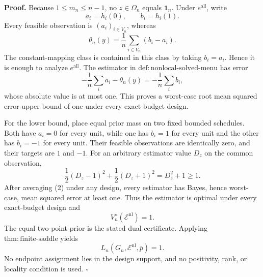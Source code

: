 \textbf{Proof.}
Because \(1\le m_n\le n-1\), no \(z\in\Omega_n\) equals \(\mathbf 1_n\).  Under \(e^{\mathrm{all}}\), write
\[
 a_i=h_i(0),\qquad b_i=h_i(1).
\]
Every feasible observation is \((a_i)_{i\in V_n}\), whereas
\[
 \theta_n(y)=\frac1n\sum_{i\in V_n}(b_i-a_i). \tag{1}
\]
The constant-mapping class is contained in this class by taking \(b_i=a_i\).  Hence it is enough to analyze \(e^{\mathrm{all}}\).  The estimator in \(\mathrm{def{:}nonlocal\text{-}solved\text{-}menu}\) has error
\[
 -\frac1n\sum_i a_i-\theta_n(y)
 =-\frac1n\sum_i b_i,
\]
whose absolute value is at most one.  This proves a worst-case root mean squared error upper bound of one under every exact-budget design.

For the lower bound, place equal prior mass on two fixed bounded schedules.  Both have \(a_i=0\) for every unit, while one has \(b_i=1\) for every unit and the other has \(b_i=-1\) for every unit.  Their feasible observations are identically zero, and their targets are \(1\) and \(-1\).  For an arbitrary estimator value \(D_z\) on the common observation,
\[
 \frac12(D_z-1)^2+\frac12(D_z+1)^2=D_z^2+1\ge1. \tag{2}
\]
After averaging (2) under any design, every estimator has Bayes, hence worst-case, mean squared error at least one.  Thus the estimator is optimal under every exact-budget design and
\[
 V_n^\star(\mathcal E^{\mathrm{nl}})=1.
\]
The equal two-point prior is the stated dual certificate.  Applying \(\mathrm{thm{:}finite\text{-}saddle}\) yields
\[
 L_n(G_n,\mathcal E^{\mathrm{nl}},\bar p)=1.
\]
No endpoint assignment lies in the design support, and no positivity, rank, or locality condition is used. \(\square\)